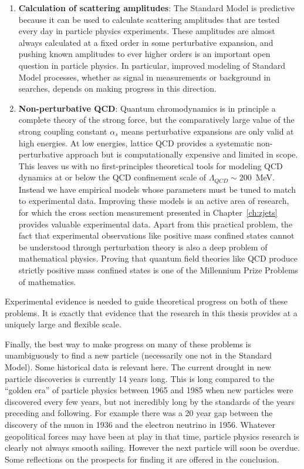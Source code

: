 \begin{enumerate}
    \item{
        \textbf{Calculation of scattering amplitudes}: The Standard Model is predictive because it can be used to calculate scattering amplitudes that are tested every day in particle physics experiments.
        These amplitudes are almost always calculated at a fixed order in some perturbative expansion, and pushing known amplitudes to ever higher orders is an important open question in particle physics.
        In particular, improved modeling of Standard Model processes, whether as signal in measurements or background in searches, depends on making progress in this direction.
    }
    \item{
        \textbf{Non-perturbative QCD}: Quantum chromodynamics is in principle a complete theory of the strong force, but the comparatively large value of the strong coupling constant $\alpha_s$ means perturbative expansions are only valid at high energies.
        At low energies, lattice QCD provides a systematic non-perturbative approach but is computationally expensive and limited in scope.
        This leaves us with no first-principles theoretical tools for modeling QCD dynamics at or below the QCD confinement scale of $\Lambda_{QCD} \sim 200$~MeV.
        Instead we have empirical models whose parameters must be tuned to match to experimental data.
        Improving these models is an active area of research, for which the cross section measurement presented in Chapter~\ref{ch:zjets} provides valuable experimental data.
        Apart from this practical problem, the fact that experimental observations like positive mass confined states cannot be understood through perturbation theory is also a deep problem of mathematical physics.
        Proving that quantum field theories like QCD produce strictly positive mass confined states is one of the Millennium Prize Problems of mathematics.
    }
\end{enumerate}

Experimental evidence is needed to guide theoretical progress on both of these problems.
It is exactly that evidence that the research in this thesis provides at a uniquely large and flexible scale.

Finally, the best way to make progress on many of these problems is unambiguously to find a new particle (necessarily one not in the Standard Model).
Some historical data is relevant here.
The current drought in new particle discoveries is currently 14 years long.
This is long compared to the ``golden era'' of particle physics between 1965 and 1985 when new particles were discovered every few years, but not incredibly long by the standards of the years preceding and following.
For example there was a 20 year gap between the discovery of the muon in 1936 and the electron neutrino in 1956.
Whatever geopolitical forces may have been at play in that time, particle physics research is clearly not always smooth sailing.
However the next particle will soon be overdue.
Some reflections on the prospects for finding it are offered in the conclusion.

